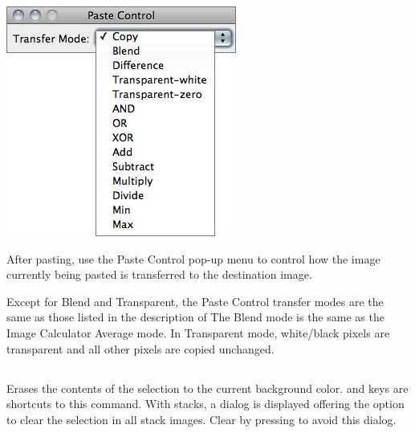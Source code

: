 \begin{minipage}[c][1\totalheight][t]{0.405\columnwidth}%
\includegraphics[scale=0.55]{images/PasteControl}%
\end{minipage}%
\begin{minipage}[c][1\totalheight][t]{0.595\columnwidth}%
After pasting, use the Paste Control pop-up menu to
control how the image currently being pasted is transferred to the
destination image.\medskip{}


Except for Blend and Transparent, the Paste Control transfer modes
are the same as those listed in the description of 
The Blend mode is the same as the Image Calculator Average mode. In
Transparent mode, white/black pixels are transparent and all other
pixels are copied unchanged.


%
\end{minipage}


\subsection{\protect{}\label{sub:Clear}}

Erases the contents of the selection to the current background color.
 and  keys are shortcuts
to this command. With stacks, a dialog is displayed offering the option
to clear the selection in all stack images. Clear by pressing 
to avoid this dialog.




